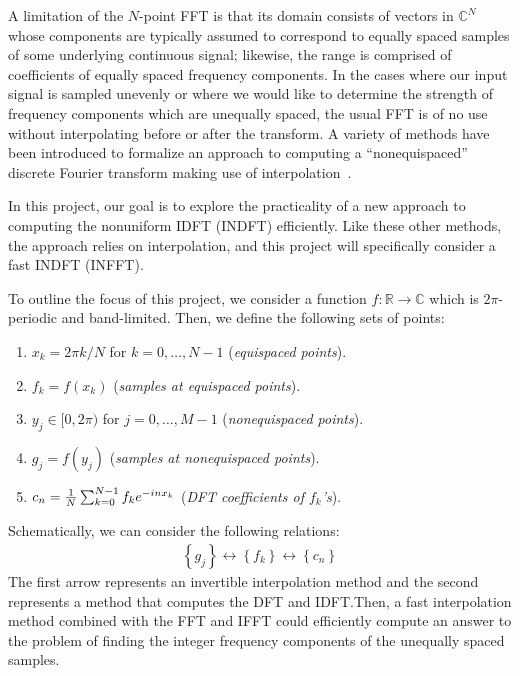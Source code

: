 \documentclass{article}
\begin{document}
A limitation of the $N$-point
FFT is that its domain consists of vectors in $\mathbb{C}^N$
whose components are typically assumed to correspond to equally spaced
samples of some underlying continuous signal; likewise, the range is
comprised of coefficients of equally spaced frequency components. In
the cases where our input signal is sampled unevenly or where we would
like to determine the strength of frequency components which are
unequally spaced, the usual FFT is of no use without interpolating
before or after the transform. A variety of methods have been
introduced to formalize an approach to computing a ``nonequispaced''
discrete Fourier transform making use of
interpolation~\cite{Dutt95fastfourierII,Keiner06nfft3.0}.

In this project, our goal is to explore the practicality of a new
approach to computing the nonuniform IDFT (INDFT) efficiently. Like
these other methods, the approach relies on interpolation, and this
project will specifically consider a fast INDFT (INFFT).

To outline the focus of this project, we consider a function
$f : \mathbb{R} \to \mathbb{C}$
which is $2\pi$-periodic
and band-limited. Then, we define the following sets of points:
\begin{enumerate}
\item $x_k = 2\pi k/N$ for $k = 0, \hdots, N-1$ (\emph{equispaced points}).
\item $f_k = f(x_k)$ (\emph{samples at equispaced points}).
\item $y_j \in [0, 2\pi)$ for $j = 0, \hdots, M - 1$ (\emph{nonequispaced points}).
\item $g_j = f(y_j)$ (\emph{samples at nonequispaced points}).
\item $c_n = {1 \over N} \sum_{k=0}^{N-1} f_k e^{-inx_k}$ (\emph{DFT coefficients of $f_k$'s}).
\end{enumerate}
Schematically, we can consider the following relations:
\begin{align}
  \left\{g_j\right\} \longleftrightarrow \left\{f_k\right\} \longleftrightarrow \left\{c_n\right\}
\end{align}
The first arrow represents an invertible interpolation method and the
second represents a method that computes the DFT and IDFT.\@ Then, a
fast interpolation method combined with the FFT and IFFT could
efficiently compute an answer to the problem of finding the integer
frequency components of the unequally spaced samples.
\end{document}
